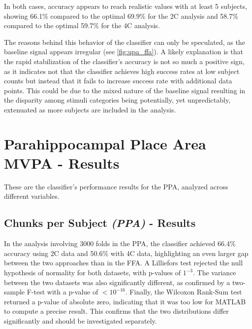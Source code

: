 In both cases, accuracy appears to reach realistic values with at least 5 subjects, showing 66.1\% compared to the optimal 69.9\% for the \gls{2C} analysis and 58.7\% compared to the optimal 59.7\% for the \gls{4C} analysis.

The reasons behind this behavior of the classifier can only be speculated, as the baseline signal appears irregular (see \autoref{fig:upa_ffa}). A likely explanation is that the rapid stabilization of the classifier's accuracy is not so much a positive sign, as it indicates not that the classifier achieves high success rates at low subject counts but instead that it fails to increase success rate with additional data points. This could be due to the mixed nature of the baseline signal resulting in the disparity among stimuli categories being potentially, yet unpredictably, extenuated as more subjects are included in the analysis.










\section{Parahippocampal Place Area MVPA - Results}

These are the classifier's performance results for the \gls{PPA}, analyzed across different variables.

\subsection{Chunks per Subject \textit{(PPA)} - Results}

In the analysis involving 3000 folds in the \gls{PPA}, the classifier achieved 66.4\% accuracy using \gls{2C} data and 50.6\% with \gls{4C} data, highlighting an even larger gap between the two approaches than in the \gls{FFA}. A Lilliefors test rejected the null hypothesis of normality for both datasets, with p-values of $1^{-3}$. The variance between the two datasets was also significantly different, as confirmed by a two-sample F-test with a p-value of $<10^{-16}$. Finally, the Wilcoxon Rank-Sum test returned a p-value of absolute zero, indicating that it was too low for MATLAB to compute a precise result. This confirms that the two distributions differ significantly and should be investigated separately.


